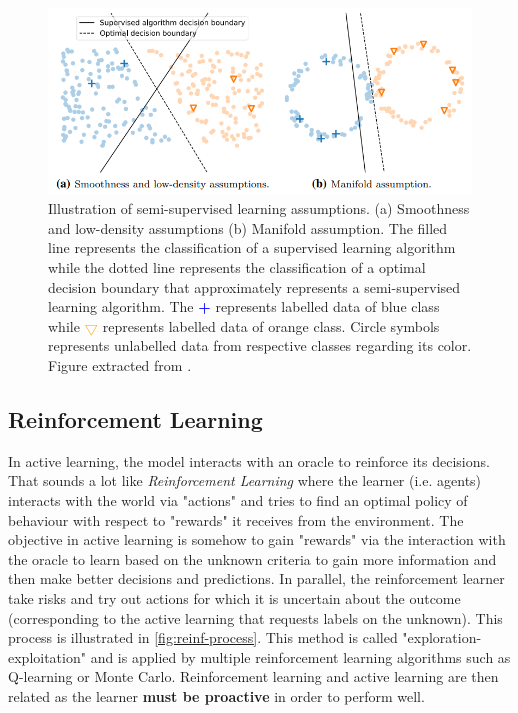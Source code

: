\documentclass[11pt, openany]{report}
\theoremstyle{plain}
\theoremstyle{definition}
\theoremstyle{remark}
\begin{document}
\begin{figure}[H]
  \centering
  \includegraphics[scale=0.7]{figures/ssl-assumptions.png}
  \caption{Illustration of semi-supervised learning assumptions. (a) Smoothness and low-density assumptions (b) Manifold assumption. The filled line represents the classification of a supervised learning algorithm while the dotted line represents the classification of a optimal decision boundary that approximately represents a semi-supervised learning algorithm. The \textbf{\textcolor{blue}{+}} represents labelled data of blue class while \textbf{\textcolor{orange}{$\bigtriangledown$}} represents labelled data of orange class. Circle symbols represents unlabelled data from respective classes regarding its color. Figure extracted from \cite{SSL-survey}.  }
  \label{fig:assumptions-ssl}
\end{figure} 

\subsection{Reinforcement Learning}
In active learning, the model interacts with an oracle to reinforce its decisions. That sounds a lot like \textit{Reinforcement Learning} where the learner (i.e. agents) interacts with the world via "actions" and tries to find an optimal policy of behaviour with respect to "rewards" it receives from the environment. The objective in active learning is somehow to gain "rewards" via the interaction with the oracle to learn based on the unknown criteria to gain more information and then make better decisions and predictions. In parallel, the reinforcement learner take risks and try out actions for which it is uncertain about the outcome (corresponding to the active learning that requests labels on the unknown). This process is illustrated in \autoref{fig:reinf-process}. This method is called "exploration-exploitation" and is applied by multiple reinforcement learning algorithms such as Q-learning or Monte Carlo. Reinforcement learning and active learning are then related as the learner \textbf{must be proactive} in order to perform well. 
\end{document}
